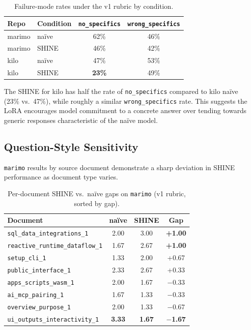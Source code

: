 \documentclass[conference,10.5pt]{IEEEtran}
\begin{document}
\begin{table}[h]
\centering
\caption{Failure-mode rates under the v1 rubric by condition.}
\label{tab:failure-modes}
\begin{tabular}{llcc}
\toprule
\textbf{Repo} & \textbf{Condition} & \texttt{no\_specifics} & \texttt{wrong\_specifics} \\
\midrule
marimo & naïve & 62\% & 46\% \\
marimo & SHINE & 46\% & 42\% \\
kilo   & naïve & 47\% & 53\% \\
kilo   & SHINE & \textbf{23\%} & 49\% \\
\bottomrule
\end{tabular}
\end{table}

The SHINE for kilo has half the rate of \texttt{no\_specifics} compared to kilo naïve (23\% vs.\ 47\%), while roughly a similar \texttt{wrong\_specifics} rate. This suggests the LoRA encourages model commitment to a concrete answer over tending towards generic responses characteristic of the naïve model.

\subsection{Question-Style Sensitivity}

\texttt{marimo} results by source document demonstrate a sharp deviation in SHINE performance as document type varies. 

\begin{table}[h]
\centering
\caption{Per-document SHINE vs.\ naïve gaps on \texttt{marimo} (v1 rubric, sorted by gap).}
\label{tab:per-doc-marimo}
\begin{tabular}{lccc}
\toprule
\textbf{Document} & \textbf{naïve} & \textbf{SHINE} & \textbf{Gap} \\
\midrule
\texttt{sql\_data\_integrations\_1}       & 2.00 & 3.00 & \textbf{+1.00} \\
\texttt{reactive\_runtime\_dataflow\_1}   & 1.67 & 2.67 & \textbf{+1.00} \\
\texttt{setup\_cli\_1}                    & 1.33 & 2.00 & +0.67 \\
\texttt{public\_interface\_1}             & 2.33 & 2.67 & +0.33 \\
\texttt{apps\_scripts\_wasm\_1}           & 2.00 & 1.67 & $-$0.33 \\
\texttt{ai\_mcp\_pairing\_1}              & 1.67 & 1.33 & $-$0.33 \\
\texttt{overview\_purpose\_1}             & 2.00 & 1.33 & $-$0.67 \\
\texttt{ui\_outputs\_interactivity\_1}    & \textbf{3.33} & \textbf{1.67} & \textbf{$-$1.67} \\
\bottomrule
\end{tabular}
\end{table}
\end{document}
